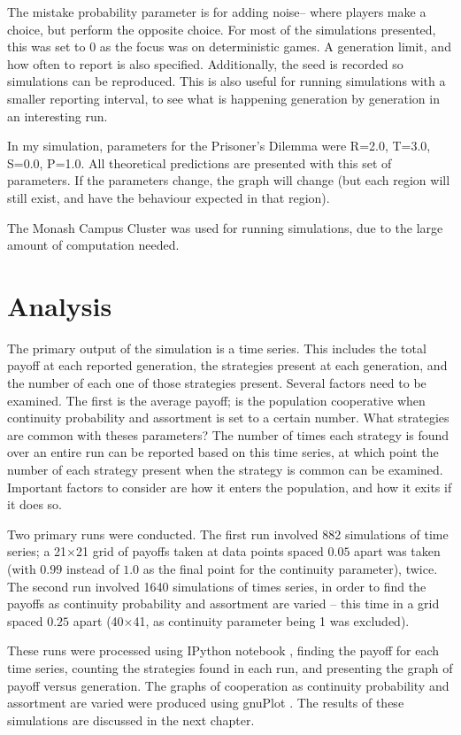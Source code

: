 \documentclass[a4paper,11pt,bcshonoursthesis,singlespace,oneside,thesisdraft,pdflatex]{cssethesis}
\begin{document}
The mistake probability parameter is for adding noise-- where players make a choice, but perform the opposite choice. For most of the simulations presented, this was set to $0$ as the focus was on deterministic games. 
A generation limit, and how often to report is also specified. Additionally, the seed is recorded so simulations can be reproduced. This is also useful for running simulations with a smaller reporting interval, to see what is happening generation by generation in an interesting run. 

In my simulation, parameters for the Prisoner's Dilemma were R=2.0, T=3.0, S=0.0, P=1.0. 
All theoretical predictions are presented with this set of parameters. 
If the parameters change, the graph will change (but each region will still exist, and have the behaviour expected in that region). 

The Monash Campus Cluster \citep{cluster} was used for running simulations, due to the large amount of computation needed. 

\section{Analysis}
The primary output of the simulation is a time series. 
This includes the total payoff at each reported generation, the strategies present at each generation, and the number of each one of those strategies present. 
Several factors need to be examined. The first is the average payoff; is the population cooperative when continuity probability and assortment is set to a certain number. 
What strategies are common with theses parameters? 
The number of times each strategy is found over an entire run can be reported based on this time series, at which point the number of each strategy present when the strategy is common can be examined. Important factors to consider are how it enters the population, and how it exits if it does so. 

Two primary runs were conducted. 
The first run involved 882 simulations of time series; a 21$\times$21 grid of payoffs taken at data points spaced $0.05$ apart was taken (with $0.99$ instead of $1.0$ as the final point for the continuity parameter), twice. 
The second run involved 1640 simulations of times series, in order to find the payoffs as continuity probability and assortment are varied -- this time in a grid spaced $0.25$ apart (40$\times$41, as continuity parameter being 1 was excluded). 

These runs were processed using IPython notebook \citep{PER-GRA:2007}, finding the payoff for each time series, counting the strategies found in each run, and presenting the graph of payoff versus generation. 
The graphs of cooperation as continuity probability and assortment are varied were produced using gnuPlot \citep{Gnuplot_4.4}. 
The results of these simulations are discussed in the next chapter.
\end{document}
